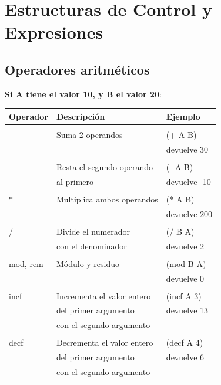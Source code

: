 \documentclass[10pt,journal,compsoc]{IEEEtran}
\begin{document}
\section{Estructuras de Control y Expresiones}

\subsection{Operadores aritm\'eticos}
\textbf{Si A tiene el valor 10, y B el valor 20}:
\begin{tabular}{ l | l | l}
	\hline
	Operador & Descripci\'on & Ejemplo\\ 
	\hline\\
	 + & Suma 2 operandos &  (+ A B)\\ &&devuelve 30\\
	\hline\\
	- & Resta el segundo operando & (- A B)\\&al primero &devuelve -10\\
	\hline\\
	$*$ &Multiplica ambos operandos& (* A B) \\ &&devuelve 200\\
	\hline\\
	/ & Divide el numerador & (/ B A)\\&con el denominador &devuelve 2\\ 
	\hline\\
	mod, rem & M\'odulo y residuo &(mod B A) \\ &&devuelve 0 \\
	\hline\\
	incf& Incrementa el valor entero & (incf A 3)\\ &del primer argumento & devuelve 13\\ &con el segundo argumento\\
	\hline\\
	decf& Decrementa el valor entero & (decf A 4)\\ &del primer argumento &devuelve 6\\ &con el segundo argumento \\
\end{tabular}
\end{document}
